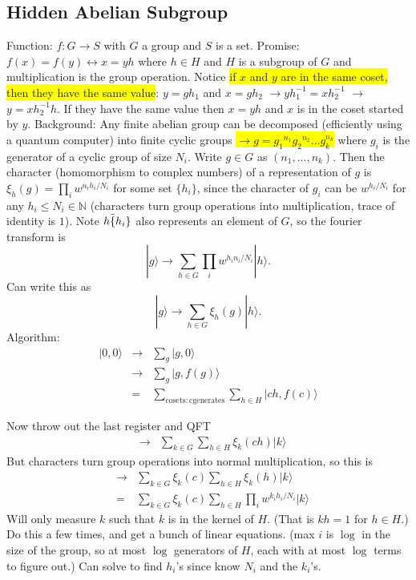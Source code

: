 \documentclass[12pt]{article}
\newcommand{\hilight}[1]{\colorbox{yellow}{#1}}
\begin{document}
\subsection{Hidden Abelian Subgroup}
Function: $f:G\rightarrow S$ with $G$ a group and $S$ is a set. \newline
Promise: $f(x)=f(y)\leftrightarrow x=yh$ where $h\in H$ and $H$ is a subgroup of $G$ and multiplication is the group operation. Notice \hilight{if $x$ and $y$ are in the same coset, then they have the same value}: $y=gh_1$ and $x=gh_2$ $\rightarrow yh_1^{-1}=xh_2^{-1}$ $\rightarrow$ $y=xh_2^{-1}h$. If they have the same value then $x=yh$ and $x$ is in the coset started by $y$.\newline
Background: Any finite abelian group can be decomposed (efficiently using a quantum computer) into finite cyclic groups
\hilight{ $\rightarrow g={g_1}^{n_1}{g_2}^{n_2}\dots g_k^{n_k}$} where $g_i$ is the generator of a cyclic group of
 size $N_i$. Write $g\in G$ as $(n_1,\dots,n_k)$. Then the character (homomorphism to complex numbers) of a representation of $g$ is
 $\xi_h(g)=\prod_iw^{n_ih_i/N_i}$ for some set $\{h_i\}$, since the character of $g_i$ can be $w^{h_i/N_i}$ for any $h_i\leq N_i\in\mathbb{N}$ (characters turn group operations into multiplication, trace of identity is $1$). Note $h\tilde\{h_i\}$ also represents an element of $G$, so the fourier transform is
$$|g\rangle\rightarrow\sum_{h\in G}\prod_iw^{h_in_i/N_i}|h\rangle.$$
Can write this as
$$|g\rangle\rightarrow\sum_{h\in G}\xi_h(g)|h\rangle.$$
Algorithm:
\begin{eqnarray}
|0,0\rangle&\rightarrow&\sum_g|g,0\rangle\\
&\rightarrow&\sum_g|g,f(g)\rangle\\
&=&\sum_{\mathrm{cosets:c generates}}\sum_{h\in H}|ch,f(c)\rangle
\end{eqnarray}

Now throw out the last register and QFT
\begin{eqnarray}
&\rightarrow&\sum_{k\in G}\sum_{h\in H}\xi_k(ch)|k\rangle
\end{eqnarray}
But characters turn group operations into normal multiplication, so this is 
\begin{eqnarray}
&\rightarrow&\sum_{k\in G}\xi_k(c)\sum_{h\in H}\xi_k(h)|k\rangle \\
&=&\sum_{k\in G}\xi_k(c)\sum_{h\in H}\prod_iw^{k_ih_i/N_i}|k\rangle
\end{eqnarray}
Will only measure $k$ such that $k$  is in the kernel of $H$. (That is $kh=1$ for $h\in H$.) Do this a few times, and get a bunch of linear equations. (max $i$ is $\log$ in the size of the group, so at most $\log$ generators of $H$, each with at most $\log$ terms to figure out.) Can solve to find $h_i$'s since know $N_i$ and the $k_i$'s.
\end{document}
